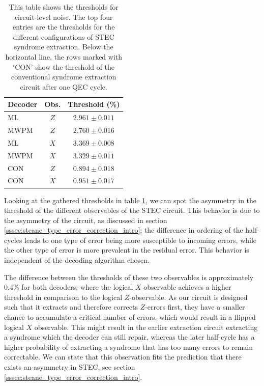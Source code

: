 \begin{table}[th]
    \centering
    \begin{tabular}{lcc}
    \hline
    Decoder & Obs. & Threshold (\%) \\
    \hline
    ML   & $Z$ & $2.961 \pm 0.011$ \\
    MWPM & $Z$ & $2.760 \pm 0.016$ \\
    ML   & $X$ & $3.369 \pm 0.008$ \\
    MWPM & $X$ & $3.329 \pm 0.011$ \\
    \hline
    CON & $Z$ & $0.894 \pm 0.018$ \\
    CON & $X$ & $0.951 \pm 0.017$ \\
    \hline
    \end{tabular}
    \caption{
        This table shows the thresholds for circuit-level noise.
        The top four entries are the thresholds for the different configurations of STEC syndrome extraction. 
        Below the horizontal line, the rows marked with `CON' show the threshold of the conventional syndrome extraction circuit after one QEC cycle. 
        }
    \label{tab:results_circ_single_round}
\end{table}

Looking at the gathered thresholds in table \ref{tab:results_circ_single_round}, we can spot the asymmetry in the threshold of the different observables of the STEC circuit. 
This behavior is due to the asymmetry of the circuit, as discussed in section \ref{sssec:steane_type_error_correction_intro}; 
the difference in ordering of the half-cycles leads to one type of error being more susceptible to incoming errors, while the other type of error is more prevalent in the residual error.
This behavior is independent of the decoding algorithm chosen.

The difference between the thresholds of these two observables is approximately $0.4\%$ for both decoders, where the logical $X$ observable achieves a higher threshold in comparison to the logical $Z$-observable.
As our circuit is designed such that it extracts and therefore corrects $Z$-errors first, they have a smaller chance to accumulate a critical number of errors, 
which would result in a flipped logical $X$ observable.
This might result in the earlier extraction circuit extracting a syndrome which the decoder can still repair, 
whereas the later half-cycle has a higher probability of extracting a syndrome that has too many errors to remain correctable.
We can state that this observation fits the prediction that there exists an asymmetry in STEC, see section \ref{sssec:steane_type_error_correction_intro}.

